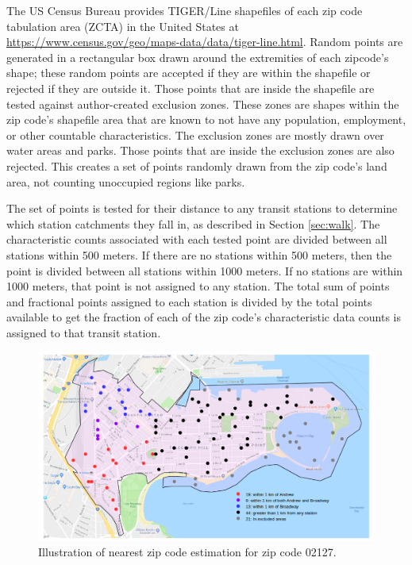 \documentclass[11pt]{article}
\begin{document}
The US Census Bureau provides TIGER/Line shapefiles of each zip code tabulation area (ZCTA) in the United States at \url{https://www.census.gov/geo/maps-data/data/tiger-line.html}. Random points are generated in a rectangular box drawn around the extremities of each zipcode's shape; these random points are accepted if they are within the shapefile or rejected if they are outside it. Those points that are inside the shapefile are tested against author-created exclusion zones. These zones are shapes within the zip code's shapefile area that are known to not have any population, employment, or other countable characteristics. The exclusion zones are mostly drawn over water areas and parks. Those points that are inside the exclusion zones are also rejected. This creates a set of points randomly drawn from the zip code's land area, not counting unoccupied regions like parks. 

The set of points is tested for their distance to any transit stations to determine which station catchments they fall in, as described in Section \ref{sec:walk}. The characteristic counts associated with each tested point are divided between all stations within 500 meters. If there are no stations within 500 meters, then the point is divided between all stations within 1000 meters. If no stations are within 1000 meters, that point is not assigned to any station. The total sum of points and fractional points assigned to each station is divided by the total points available to get the fraction of each of the zip code's characteristic data counts is assigned to that transit station. 

\begin{figure}
\begin{center}\includegraphics[scale=0.55]{geo_point_demonstration}\end{center}\caption{Illustration of nearest zip code estimation for zip code 02127.}\label{fig:f1}
\end{figure}
\end{document}
